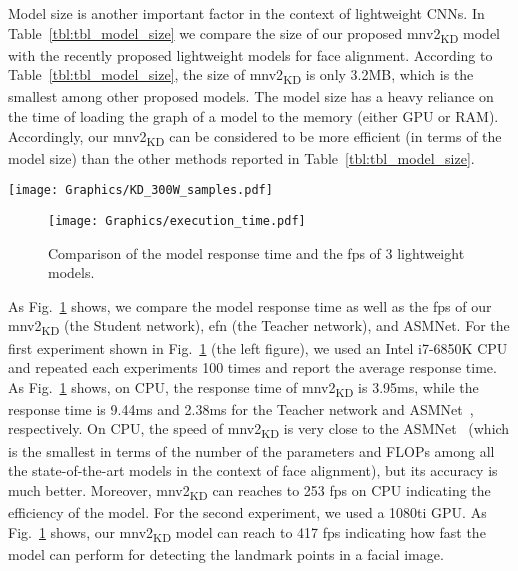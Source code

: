 \documentclass[times,twocolumn,final,authoryear]{elsarticle}
\begin{document}
Model size is another important factor in the context of lightweight CNNs. In Table~\ref{tbl:tbl_model_size} we compare the size of our proposed mnv2\textsubscript{KD} model with the recently proposed lightweight models for face alignment. According to Table~\ref{tbl:tbl_model_size}, the size of mnv2\textsubscript{KD} is only 3.2MB, which is the smallest among other proposed models. The model size has a heavy reliance on the time of loading the graph of a model to the memory (either GPU or RAM). Accordingly, our mnv2\textsubscript{KD} can be considered to be more efficient (in terms of the model size) than the other methods reported in Table~\ref{tbl:tbl_model_size}.

\begin{figure*}[t!]
  \centering
  \texttt{[image: Graphics/KD\_300W\_samples.pdf]}
  \caption{Face alignment using mnv2\textsubscript{KD} and mnv2 on the 300W~\cite{sagonas2013300}. For each landmark point if the error rate with respect to the normalization factor, is more than 0.1, it is considered as a failure and we printed it red, and otherwise it is green.}
  \label{fig:300W_samples_mnKD}
\end{figure*}


\begin{figure}[t]
  \centering
      \texttt{[image: Graphics/execution\_time.pdf]}
  \caption{Comparison of the model response time and the fps of 3 lightweight models.}
  \label{fig:execution_time}
\end{figure}



As Fig.~\ref{fig:execution_time} shows, we compare the model response time as well as the fps of our mnv2\textsubscript{KD} (the Student network), efn (the Teacher network), and ASMNet. For the first experiment shown in Fig.~\ref{fig:execution_time} (the left figure), we used an Intel i7-6850K CPU and repeated each experiments 100 times and report the average response time. As Fig.~\ref{fig:execution_time} shows, on CPU, the response time of mnv2\textsubscript{KD} is 3.95ms, while the response time is 9.44ms and 2.38ms for the Teacher network and ASMNet~\cite{fard2021asmnet}, respectively. On CPU, the speed of mnv2\textsubscript{KD} is very close to the ASMNet~\cite{fard2021asmnet} (which is the smallest in terms of the number of the parameters and FLOPs among all the state-of-the-art models in the context of face alignment), but its accuracy is much better. Moreover, mnv2\textsubscript{KD} can reaches to 253 fps on CPU indicating the efficiency of the model. For the second experiment, we used a 1080ti GPU. As Fig.~\ref{fig:execution_time} shows, our mnv2\textsubscript{KD} model can reach to 417 fps indicating how fast the model can perform for detecting the landmark points in a facial image.
\end{document}
